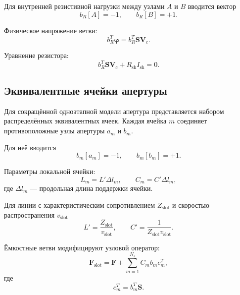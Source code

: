 \documentclass[12pt,a4paper]{article}
\newcommand{\vect}[1]{\boldsymbol{#1}}
\newcommand{\matr}[1]{\mathbf{#1}}
\begin{document}
Для внутренней резистивной нагрузки между узлами $A$ и $B$
вводится вектор
\begin{equation}
    b_R[A]=-1,
    \qquad
    b_R[B]=+1.
\end{equation}

Физическое напряжение ветви:
\begin{equation}
    b_R^T\vect\varphi
    =
    b_R^T\matr S\vect V_c.
\end{equation}

Уравнение резистора:
\begin{equation}
    b_R^T\matr S\vect V_c
    +
    R_{\mathrm{sh}}I_{\mathrm{sh}}
    =
    0.
\end{equation}


\subsection{Эквивалентные ячейки апертуры}

Для сокращённой одноэтапной модели апертура представляется
набором распределённых эквивалентных ячеек.
Каждая ячейка $m$ соединяет противоположные узлы апертуры
$a_m$ и $b_m$.

Для неё вводится
\begin{equation}
    b_m[a_m]=-1,
    \qquad
    b_m[b_m]=+1.
\end{equation}

Параметры локальной ячейки:
\begin{equation}
    L_m=L'\Delta l_m,
    \qquad
    C_m=C'\Delta l_m,
\end{equation}
где $\Delta l_m$ --- продольная длина поддержки ячейки.

Для линии с характеристическим сопротивлением $Z_{\mathrm{slot}}$
и скоростью распространения $v_{\mathrm{slot}}$
\begin{equation}
    L'
    =
    \frac{Z_{\mathrm{slot}}}{v_{\mathrm{slot}}},
    \qquad
    C'
    =
    \frac{1}{
        Z_{\mathrm{slot}}v_{\mathrm{slot}}
    }.
\end{equation}

Ёмкостные ветви модифицируют узловой оператор:
\begin{equation}
    \matr F_{\mathrm{slot}}
    =
    \matr F
    +
    \sum_{m=1}^{N_s}
    C_m
    b_m
    c_m^T,
\end{equation}
где
\begin{equation}
    c_m^T
    =
    b_m^T\matr S.
\end{equation}
\end{document}
